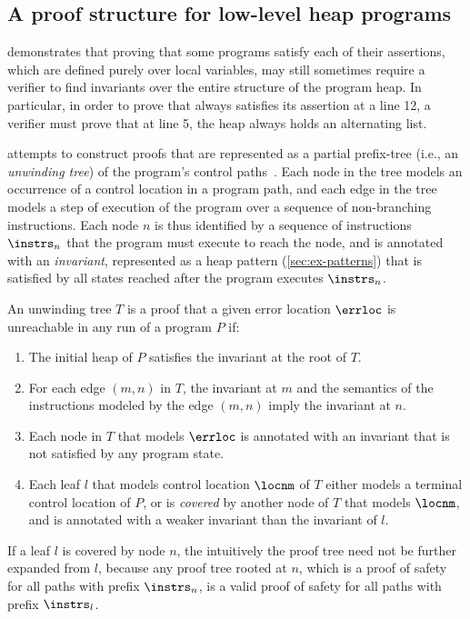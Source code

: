 \subsection{A proof structure for low-level heap programs}
\label{sec:ex-tree}
\altlist demonstrates that proving that some programs satisfy each of
their assertions, which are defined purely over local variables, may
still sometimes require a verifier to find invariants over the entire
structure of the program heap.
%
In particular, in order to prove that \altlist always satisfies its
assertion at a line 12, a verifier must prove that at line 5, the heap
always holds an alternating list.

\verifier attempts to construct proofs that are represented as a
partial prefix-tree (i.e., an \emph{unwinding tree}) of the program's
control paths~\cite{mcmillan06}.
Each node in the tree models an occurrence of a control location in a
program path, and each edge in the tree models a step of execution of
the program over a sequence of non-branching instructions.
Each node $n$ is thus identified by a sequence of instructions
$\instrs_n$ that the program must execute to reach the node, and is
annotated with an \emph{invariant}, represented as a heap pattern
(\autoref{sec:ex-patterns}) that is satisfied by all states reached
after the program executes $\instrs_n$.

An unwinding tree $T$ is a proof that a given error location $\errloc$
is unreachable in any run of a program $P$ if:
%
\begin{enumerate}
%
\item
  The initial heap of $P$ satisfies the invariant at the root of $T$.
\item
  For each edge $(m, n)$ in $T$, the invariant at $m$ and the
  semantics of the instructions modeled by the edge $(m, n)$ imply the
  invariant at $n$.
\item
  Each node in $T$ that models $\errloc$ is annotated with an
  invariant that is not satisfied by any program state.
\item
  Each leaf $l$ that models control location $\locnm$ of $T$ either
  models a terminal control location of $P$, or is \emph{covered} by
  another node of $T$ that models $\locnm$, and is annotated with a
  weaker invariant than the invariant of $l$.
\end{enumerate}
%
If a leaf $l$ is covered by node $n$, the intuitively the proof tree
need not be further expanded from $l$, because any proof tree rooted
at $n$, which is a proof of safety for all paths with prefix
$\instrs_n$, is a valid proof of safety for all paths with prefix
$\instrs_l$.

